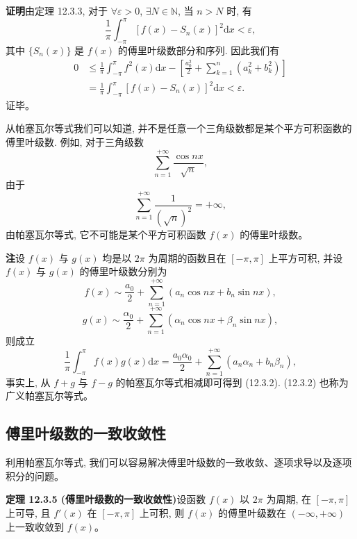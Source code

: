 \documentclass[UTF8, 12pt, fontset=fandol, oneside]{ctexart}
\begin{document}
\noindent\textbf{证明}\quad 由定理 12.3.3, 对于 $\forall\varepsilon>0$, $\exists N\in\mathbb N$, 当 $n>N$ 时, 有
\[
  \frac1\pi\int_{-\pi}^{\pi}[f(x)-S_n(x)]^2\mathrm dx<\varepsilon,
\]
其中 $\{S_n(x)\}$ 是 $f(x)$ 的傅里叶级数部分和序列. 因此我们有
\[
\begin{aligned}
  0
  &\leqslant\frac1\pi\int_{-\pi}^{\pi}f^2(x)\mathrm dx
  -\left[\frac{a_0^2}{2}+\sum_{k=1}^n(a_k^2+b_k^2)\right]\\
  &=\frac1\pi\int_{-\pi}^{\pi}[f(x)-S_n(x)]^2\mathrm dx
  <\varepsilon.
\end{aligned}
\]
证毕。

从帕塞瓦尔等式我们可以知道, 并不是任意一个三角级数都是某个平方可积函数的傅里叶级数. 例如, 对于三角级数
\[
  \sum_{n=1}^{+\infty}\frac{\cos nx}{\sqrt n},
\]
由于
\[
  \sum_{n=1}^{+\infty}\frac1{(\sqrt n)^2}=+\infty,
\]
由帕塞瓦尔等式, 它不可能是某个平方可积函数 $f(x)$ 的傅里叶级数。

\noindent\textbf{注}\quad 设 $f(x)$ 与 $g(x)$ 均是以 $2\pi$ 为周期的函数且在 $[-\pi,\pi]$ 上平方可积, 并设 $f(x)$ 与 $g(x)$ 的傅里叶级数分别为
\[
  f(x)\sim\frac{a_0}{2}+\sum_{n=1}^{+\infty}(a_n\cos nx+b_n\sin nx),
\]
\[
  g(x)\sim\frac{\alpha_0}{2}+\sum_{n=1}^{+\infty}(\alpha_n\cos nx+\beta_n\sin nx),
\]
则成立
\begin{equation}
  \frac1\pi\int_{-\pi}^{\pi}f(x)g(x)\mathrm dx
  =
  \frac{a_0\alpha_0}{2}+\sum_{n=1}^{+\infty}(a_n\alpha_n+b_n\beta_n),
  \tag{12.3.2}
\end{equation}
事实上, 从 $f+g$ 与 $f-g$ 的帕塞瓦尔等式相减即可得到 (12.3.2). (12.3.2) 也称为广义帕塞瓦尔等式。

\subsection{傅里叶级数的一致收敛性}

利用帕塞瓦尔等式, 我们可以容易解决傅里叶级数的一致收敛、逐项求导以及逐项积分的问题。

\noindent\textbf{定理 12.3.5 (傅里叶级数的一致收敛性)}\quad 设函数 $f(x)$ 以 $2\pi$ 为周期, 在 $[-\pi,\pi]$ 上可导, 且 $f'(x)$ 在 $[-\pi,\pi]$ 上可积, 则 $f(x)$ 的傅里叶级数在 $(-\infty,+\infty)$ 上一致收敛到 $f(x)$。
\end{document}
